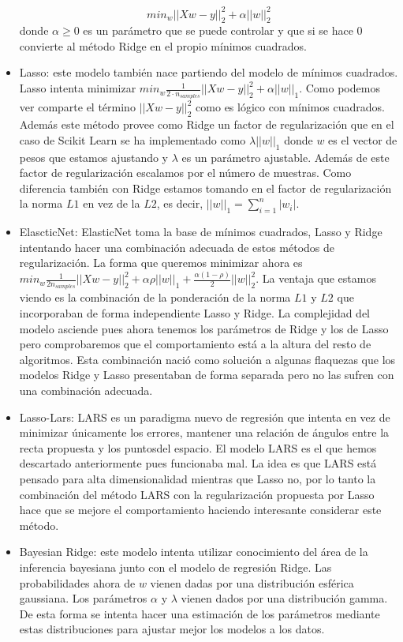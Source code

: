 \documentclass[12pt,a4paper]{article}
\begin{document}
\begin{itemize}
	$$min_w || Xw-y ||_2^2 + \alpha ||w||_2^2$$ donde $\alpha\geq 0$ es un parámetro que se puede controlar y que si se hace 0 convierte al método Ridge en el propio mínimos cuadrados.
	\item Lasso: este modelo también nace partiendo del modelo de mínimos cuadrados. Lasso intenta minimizar $min_w \frac{1}{2\cdot n_{samples}}||Xw-y||_2^2 + \alpha ||w||_1$. Como podemos ver comparte el término $||Xw-y||_2^2$ como es lógico con mínimos cuadrados. Además este método provee como Ridge un factor de regularización que en el caso de Scikit Learn se ha implementado como $\lambda ||w||_1$ donde $w$ es el vector de pesos que estamos ajustando y $\lambda$ es un parámetro ajustable. Además de este factor de regularización escalamos por el número de muestras. Como diferencia también con Ridge estamos tomando en el factor de regularización la norma $L1$ en vez de la $L2$, es decir, $||w||_1 = \sum_{i=1}^{n}|w_i|$. 
	\item ElascticNet: ElasticNet toma la base de mínimos cuadrados, Lasso y Ridge intentando hacer una combinación adecuada de estos métodos de regularización. La forma que queremos minimizar ahora es $min_w \frac{1}{2n_{samples}}|| Xw-y ||_2^2 + \alpha \rho ||w||_1 + \frac{\alpha (1-\rho)}{2}||w||_2^2$. La ventaja que estamos viendo es la combinación de la ponderación de la norma $L1$ y $L2$ que incorporaban de forma independiente Lasso y Ridge. La complejidad del modelo asciende pues ahora tenemos los parámetros de Ridge y los de Lasso pero comprobaremos que el comportamiento está a la altura del resto de algoritmos. Esta combinación nació como solución a algunas flaquezas que los modelos Ridge y Lasso presentaban de forma separada pero no las sufren con una combinación adecuada.
	\item Lasso-Lars: LARS es un paradigma nuevo de regresión que intenta en vez de minimizar únicamente los errores, mantener una relación de ángulos entre la recta propuesta y los puntosdel espacio. El modelo LARS es el que hemos descartado anteriormente pues funcionaba mal. La idea es que LARS está pensado para alta dimensionalidad mientras que Lasso no, por lo tanto la combinación del método LARS con la regularización propuesta por Lasso hace que se mejore el comportamiento haciendo interesante considerar este método.
	\item Bayesian Ridge: este modelo intenta utilizar conocimiento del área de la inferencia bayesiana junto con el modelo de regresión Ridge. Las probabilidades ahora de $w$ vienen dadas por una distribución esférica gaussiana. Los parámetros $\alpha$ y $\lambda$ vienen dados por una distribución gamma. De esta forma se intenta hacer una estimación de los parámetros mediante estas distribuciones para ajustar mejor los modelos a los datos.
\end{itemize}
\end{document}
